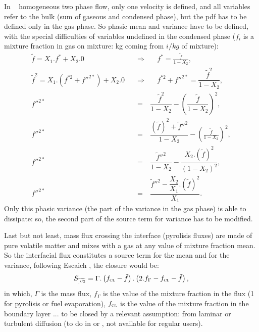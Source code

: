 In \CS~ homogeneous two phase flow, only one velocity is defined, and all
variables refer to the bulk (sum of gaseous and condensed phase), but the pdf
has to be defined only in the gas phase. So phasic mean and variance have to be
defined, with the special difficulties of variables undefined in the condensed
phase ($f_i$ is a mixture fraction in gas on mixture: kg coming from $i / kg$ of
mixture):
\begin{eqnarray}
\widetilde{f} = X_{1}.f^{*} + X_{2}.0 \quad &\Rightarrow& \quad f^{*} = \frac{\tilde f}{1-X_{2}}   ,                     \label{eq:combustion:var_001}\\
\widetilde{f}^{2} = X_{1}.\left( f^{*2} + f''^{2*} \right)+ X_{2}.0 \quad &\Rightarrow& \quad f^{*2} + f''^{2*} = \dfrac{\widetilde f^{2}}{1-X_{2}} ,                                                                                                                                         \label{Eqs_va_002} \\
f''^{2*} &=& \dfrac{\widetilde f^{2}}{1-X_{2}} - \left( \dfrac{\tilde f}{1-X_{2}}\right)^{\textstyle 2},                   \label{eq:combustion:var_003}\\
f''^{2*} &=& \dfrac{(\tilde f)^{2} + \widetilde f''^{2}}{1-X_{2}} - \left( \frac{\tilde f}{1-X_{2}}\right)^{\textstyle2}, \label{eq:combustion:var_004}\\
f''^{2*} &=& \dfrac{\widetilde f''^{2}}{1-X_{2}} -  \dfrac{X_{2}.(\tilde f)^{2}}{(1-X_{2})^{2}} ,                          \label{eq:combustion:var_005}\\
f''^{2*} &=& \dfrac{\widetilde f''^{2} - \dfrac{X_{2}}{X_{1}}.(\tilde f)^{2} }{X_{1}} .                                    \label{eq:combustion:var_006}
\end{eqnarray}
Only this phasic variance (the part of the variance in the gas phase)
is able to dissipate: so, the second part of the source term for variance has
to be modified.

Last but not least, mass flux crossing the interface (pyrolisis fluxes) are made
of pure volatile matter and mixes with a gas at any value of mixture fraction
mean. So the interfacial flux constitutes a source term for the mean and for the
variance, following Escaich \cite{Escaich:2000a}, the closure would be:
\begin{equation}
\displaystyle S_{\widetilde{.''^2}} = \Gamma . \left( f_{\mbox{\scriptsize\textsc{cl}}} -\tilde f \right) . \left( 2.f_{\Gamma} - f_{\mbox{\scriptsize\textsc{cl}}} - \tilde f \right) ,
\end{equation}
in which, $\Gamma$ is the mass flux, $f_{\Gamma}$ is the value of the mixture
fraction in the flux (1 for pyrolisis or fuel evaporation),
$f_{\mbox{\scriptsize\textsc{cl}}}$ is the value of the mixture fraction in the
boundary layer ... to be closed by a relevant assumption: from laminar or
turbulent diffusion (to do in  or
, not available for regular users).

